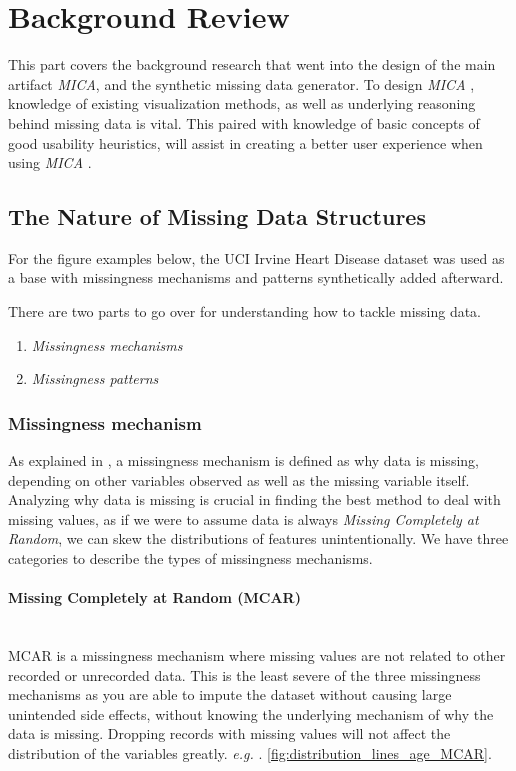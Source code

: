 \documentclass[a4paper, 11pt]{article}
\makeatletter
\newcommand{\eg}{\emph{e.g. }\@ifnextchar.{\!\@gobble}{}}
\newcommand{\mica}{\textit{MICA }}
\makeatother
\begin{document}
\newpage

\section{Background Review}
This part covers the background research that went into the design of the main
artifact \emph{MICA}, and the synthetic missing data generator. To design \mica,
knowledge of existing visualization methods, as well as underlying reasoning
behind missing data is vital. This paired with knowledge of basic concepts of
good usability heuristics, will assist in creating a better user experience when
using \mica.

\subsection{The Nature of Missing Data Structures}
For the figure examples below, the UCI Irvine Heart Disease dataset
\cite{andras_janosi_heart_1989} was used as a base with missingness mechanisms
and patterns synthetically added afterward. 

There are two parts to go over for understanding how to tackle missing data. 
\begin{enumerate}
        \item \textit{Missingness mechanisms}
        \item \textit{Missingness patterns}
\end{enumerate}

\subsubsection{Missingness mechanism}
As explained in \cite{rubin_inference_1976}, a missingness mechanism is defined
as why data is missing, depending on other variables observed as well as the
missing variable itself. Analyzing why data is missing is crucial in finding
the best method to deal with missing values, as if we were to assume data is
always \textit{Missing Completely at Random}, we can skew the distributions of
features unintentionally. We have three categories to describe the types of
missingness mechanisms.

\paragraph{\textbf{Missing Completely at Random (MCAR)}}~\\ 
MCAR is a missingness mechanism where missing values are not related to other
recorded or unrecorded data. This is the least severe of the three missingness
mechanisms as you are able to impute the dataset without causing large
unintended side effects, without knowing the underlying mechanism of why the
data is missing. Dropping records with missing values will not affect the
distribution of the variables greatly. \eg
\cref{fig:distribution_lines_age_MCAR}. 
\end{document}
